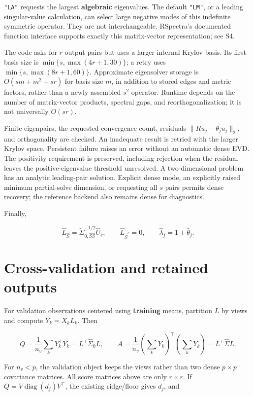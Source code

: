 \documentclass[
  11pt,
]{article}
\begin{document}
\texttt{"LA"} requests the largest \textbf{algebraic} eigenvalues. The
default \texttt{"LM"}, or a leading singular-value calculation, can
select large negative modes of this indefinite symmetric operator. They
are not interchangeable. RSpectra's documented function interface
supports exactly this matrix-vector representation; see S4.

The code asks for \(r\) output pairs but uses a larger internal Krylov
basis. Its first basis size is \(\min\{s,\max(4r+1,30)\}\); a retry uses
\(\min\{s,\max(8r+1,60)\}\). Approximate eigensolver storage is
\(O(sm+m^2+sr)\) for basis size \(m\), in addition to stored edges and
metric factors, rather than a newly assembled \(s^2\) operator. Runtime
depends on the number of matrix-vector products, spectral gaps, and
reorthogonalization; it is not universally \(O(sr)\).

Finite eigenpairs, the requested convergence count, residuals
\(\|Ru_j-\theta_ju_j\|_2\), and orthogonality are checked. An inadequate
result is retried with the larger Krylov space. Persistent failure
raises an error without an automatic dense EVD. The positivity
requirement is preserved, including rejection when the residual leaves
the positive-eigenvalue threshold unresolved. A two-dimensional problem
has an analytic leading-pair solution. Explicit dense mode, an
explicitly raised minimum partial-solve dimension, or requesting all
\(s\) pairs permits dense recovery; the reference backend also remains
dense for diagnostics.

Finally,

\[
\widehat L_{\widehat S}
=\widetilde\Sigma_{0,\widehat S\widehat S}^{-1/2}\widehat U_r,
\qquad \widehat L_{\widehat S^c}=0,
\qquad \widehat\lambda_j=1+\widehat\theta_j.
\]

\hypertarget{cross-validation-and-retained-outputs}{%
\section{Cross-validation and retained
outputs}\label{cross-validation-and-retained-outputs}}

For validation observations centered using \textbf{training} means,
partition \(L\) by views and compute \(Y_k=X_kL_k\). Then

\[
Q=\frac1{n_v}\sum_kY_k^\top Y_k=L^\top\widehat\Sigma_0L,
\qquad
A=\frac1{n_v}\left(\sum_kY_k\right)^\top
                   \left(\sum_kY_k\right)=L^\top\widehat\Sigma L.
\]

For \(n_v<p\), the validation object keeps the views rather than two
dense \(p\times p\) covariance matrices. All score matrices above are
only \(r\times r\). If \(Q=V\operatorname{diag}(d_j)V^\top\), the
existing ridge/floor gives \(\bar d_j\), and
\end{document}
